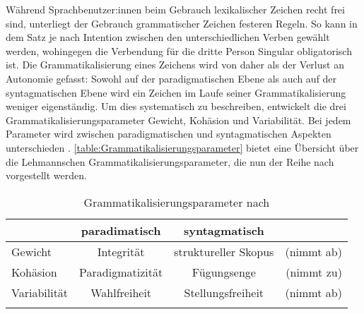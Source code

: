 Während Sprachbenutzer:innen beim Gebrauch lexikalischer Zeichen recht frei sind, unterliegt der Gebrauch grammatischer Zeichen festeren Regeln. 
So kann in dem Satz  je nach Intention zwischen den unterschiedlichen Verben gewählt werden, wohingegen die Verbendung für die dritte Person Singular obligatorisch ist.  
Die Grammatikalisierung eines Zeichens wird von \citet[130]{Lehmann.1995} daher als der Verlust an Autonomie gefasst: 
Sowohl auf der paradigmatischen Ebene als auch auf der syntagmatischen Ebene wird ein Zeichen im Laufe seiner Grammatikalisierung weniger eigenständig. 
Um dies systematisch zu beschreiben, entwickelt \citet[305]{Lehmann.1985} die drei Grammatikalisierungsparameter Gewicht, Kohäsion und Variabilität. 
Bei jedem Parameter wird zwischen paradigmatischen und syntagmatischen Aspekten unterschieden \citep[s.][131]{Lehmann.1995}. 
\autoref{table:Grammatikalisierungsparameter}  bietet eine Übersicht über die Lehmannschen Grammatikalisierungsparameter, die nun der Reihe nach vorgestellt werden.  
\begin{table}
\centering
\begin{tabular}{lccr}
\lsptoprule
                 & paradimatisch & syntagmatisch  & \\
                 \midrule
Gewicht     & Integrität           & struktureller Skopus & (nimmt ab) \\
Kohäsion   &   Paradigmatizität   &  Fügungsenge & (nimmt zu) \\
Variabilität  & Wahlfreiheit        & Stellungsfreiheit  & (nimmt ab)\\
\lspbottomrule
\end{tabular}
\caption{Grammatikalisierungsparameter nach \citet[132]{Lehmann.1995}}
\label{table:Grammatikalisierungsparameter}
\end{table}

